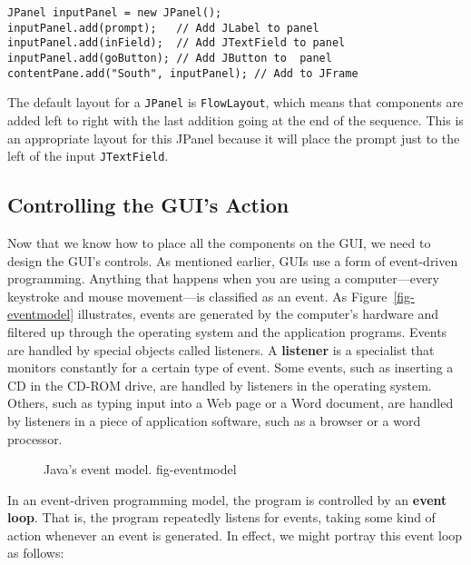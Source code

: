 \begin{jjjlisting}
\begin{lstlisting}
JPanel inputPanel = new JPanel();
inputPanel.add(prompt);   // Add JLabel to panel
inputPanel.add(inField);  // Add JTextField to panel
inputPanel.add(goButton); // Add JButton to  panel
contentPane.add("South", inputPanel); // Add to JFrame
\end{lstlisting}
\end{jjjlisting}

\noindent The default layout for a {\tt JPanel} is {\tt FlowLayout},
which means that components are added left to right with the last
addition going at the end of the sequence.  This is an appropriate
layout for this JPanel because it will place the prompt just to the
left of the input {\tt JTextField}.




\subsection{Controlling the GUI's Action}

Now that we know how to place all the components on the GUI, we need
to design the GUI's controls.  As mentioned earlier, GUIs use a form
of event-driven programming. Anything that happens when you are using
a computer---every keystroke and mouse movement---is classified as an
event. As Figure~\ref{fig-eventmodel} illustrates, events are
generated by the computer's hardware and filtered up through the
operating system and the application programs. Events are handled by
special objects called listeners. A {\bf listener} is a specialist
that monitors constantly for a certain type of event.  Some events,
such as inserting a CD in the CD-ROM drive, are handled by listeners in
the operating system. Others, such as typing input into a Web page or a
Word document, are handled by listeners in a piece of application
software, such as a browser or a word processor.

\begin{figure}[tb]
{Java's event model.}
{fig-eventmodel}

\end{figure}

In an event-driven programming model, the program is controlled by
an {\bf event loop}. That is, the program repeatedly listens
for events, taking some kind of action whenever an event is generated.
In effect, we might portray this event loop as follows:

